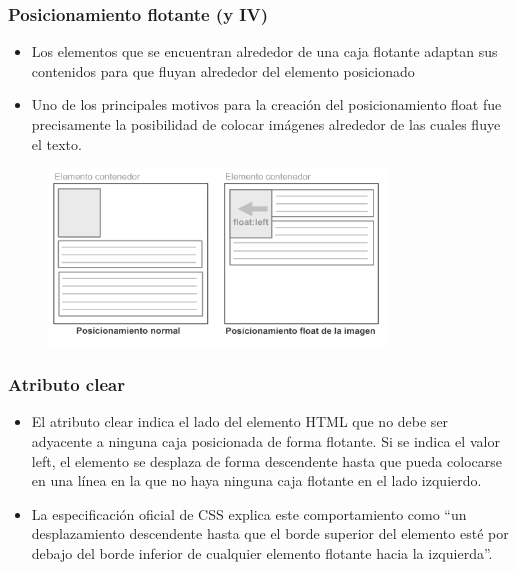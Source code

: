 \documentclass[ucs]{beamer}
\begin{document}

\begin{frame}
\frametitle{Posicionamiento flotante (y IV)}

\begin{itemize}
  \item Los elementos que se encuentran alrededor de una caja flotante adaptan sus contenidos para que fluyan alrededor del elemento posicionado
  \item Uno de los principales motivos para la creación del posicionamiento float fue precisamente la posibilidad de colocar imágenes alrededor de las cuales fluye el texto.
\end{itemize}


\begin{center}
\begin{figure}[p]
\includegraphics[width=0.8\textwidth]{figs/f0513.png}
\end{figure}
\end{center}

\end{frame}



\begin{frame}
\frametitle{Atributo clear}

\begin{itemize}
  \item El atributo clear indica el lado del elemento HTML que no debe ser adyacente a ninguna caja posicionada de forma flotante. Si se indica el valor left, el elemento se desplaza de forma descendente hasta que pueda colocarse en una línea en la que no haya ninguna caja flotante en el lado izquierdo.
  \item La especificación oficial de CSS explica este comportamiento como ``un desplazamiento descendente hasta que el borde superior del elemento esté por debajo del borde inferior de cualquier elemento flotante hacia la izquierda''.
\end{itemize}

\end{frame}
\end{document}

